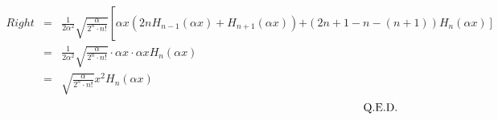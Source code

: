 \documentclass[a4paper,11pt]{article}
\newcommand{\qed}{
    \rightline{Q.E.D.}
}
\begin{document}
    \begin{eqnarray}
    Right   & = & \frac{1}{2\alpha^{2}}\sqrt{\frac{\alpha}{2^{n}\cdot n!}} \mbox{$\left[\right.$}
                \alpha x (2 n H_{n-1}(\alpha x) + H_{n+1}(\alpha x))\mbox{$+(2n+1-n-(n+1))H_{n}(\alpha x)\left.\right]$}\nonumber\\
            & = & \frac{1}{2\alpha^{2}}\sqrt{\frac{\alpha}{2^{n}\cdot n!}}\cdot\alpha x\cdot \alpha x H_{n}(\alpha x)\nonumber\\
            & = & \sqrt{\frac{\alpha}{2^{n}\cdot n!}}x^{2} H_{n}(\alpha x)\nonumber
    \end{eqnarray}
    \begin{equation}
    \qed
    \end{equation}
\end{document}
